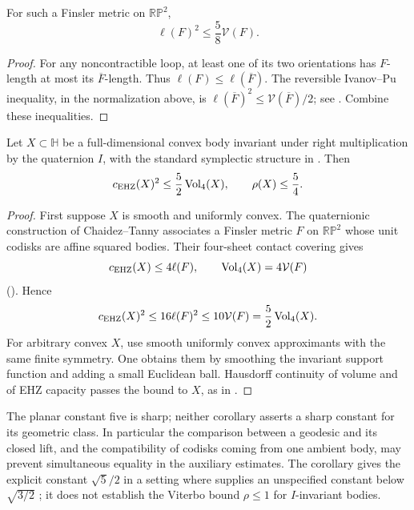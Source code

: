 \begin{corollary}\label{cor:squared-finsler}
For such a Finsler metric on $\mathbb{RP}^2$,
\[
 \ell(F)^2\leq\frac58\mathcal V(F).
\]
\end{corollary}
\begin{proof}
For any noncontractible loop, at least one of its two orientations has
$F$-length at most its $\overline F$-length. Thus
$\ell(F)\leq\ell(\overline F)$. The reversible Ivanov--Pu inequality,
in the normalization above, is
$\ell(\overline F)^2\leq\mathcal V(\overline F)/2$;
see \cite[Theorem~3.7 and Lemma~3.8]{CT2026}. Combine these inequalities.
\end{proof}

\begin{corollary}\label{cor:I-symmetric}
Let $X\subset\mathbb H$ be a full-dimensional convex body invariant
under right multiplication by the quaternion $I$, with the standard
symplectic structure in \cite{CT2026}. Then
\[
 c_{\mathrm{EHZ}}(X)^2\leq\frac52\operatorname{Vol}_4(X),\qquad
 \rho(X)\leq\frac54.
\]
\end{corollary}
\begin{proof}
First suppose $X$ is smooth and uniformly convex. The quaternionic
construction of Chaidez--Tanny associates a Finsler metric $F$ on
$\mathbb{RP}^2$ whose unit codisks are affine squared bodies. Their
four-sheet contact covering gives
\[
 c_{\mathrm{EHZ}}(X)\leq4\ell(F),\qquad
 \operatorname{Vol}_4(X)=4\mathcal V(F)
\]
(\cite[Theorem~4.4 and equations~(5.2)--(5.3)]{CT2026}). Hence
\[
 c_{\mathrm{EHZ}}(X)^2\leq16\ell(F)^2
 \leq10\mathcal V(F)=\frac52\operatorname{Vol}_4(X).
\]
For arbitrary convex $X$, use smooth uniformly convex approximants with
the same finite symmetry. One obtains them by smoothing the invariant
support function and adding a small Euclidean ball. Hausdorff continuity
of volume and of EHZ capacity passes the bound to $X$, as in
\cite[Remark~5.4]{CT2026}.
\end{proof}

The planar constant five is sharp; neither corollary asserts a sharp
constant for its geometric class. In particular the comparison between a
geodesic and its closed lift, and the compatibility of codisks coming from
one ambient body, may prevent simultaneous equality in the auxiliary
estimates. The corollary gives the explicit constant $\sqrt5/2$ in a setting where
\cite[Theorem~11]{CT2026} supplies an unspecified constant below $\sqrt{3/2}$ ; it does not
establish the Viterbo bound $\rho\leq1$ for $I$-invariant bodies.
